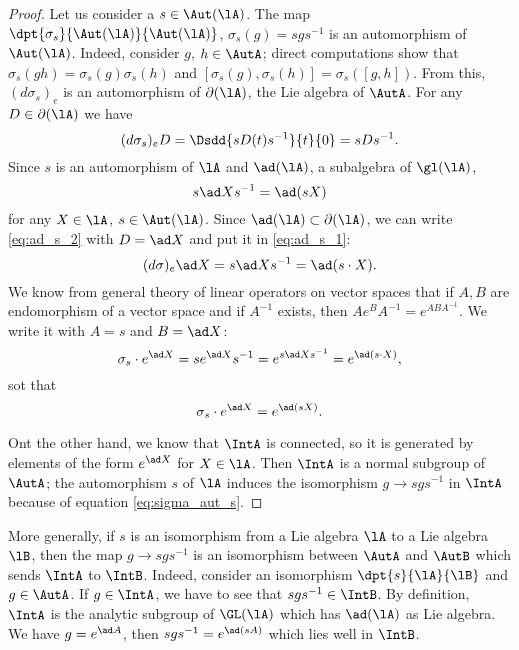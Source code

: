 \begin{proof}
Let us consider a $s\in\Aut(\lA)$. The map $\dpt{\sigma_s}{\Aut(\lA)}{\Aut(\lA)}$, $\sigma_s(g)=sgs^{-1}$ is an automorphism of $\Aut(\lA)$. Indeed, consider $g$, $h\in\AutA$; direct computations show that $\sigma_s(gh)=\sigma_s(g)\sigma_s(h)$ and $[\sigma_s(g),\sigma_s(h)]=\sigma_s([g,h])$. From this, $(d\sigma_s)_e$ is an automorphism of $\partial(\lA)$, the Lie algebra of $\AutA$. For any $D\in\partial(\lA)$ we have
\begin{equation}\label{eq:ad_s_2}
 (d\sigma_s)_eD=\Dsdd{ sD(t)s^{-1} }{t}{0}
             =sDs^{-1}.
\end{equation}
Since $s$ is an automorphism of $\lA$ and $\ad(\lA)$, a subalgebra of $\gl(\lA)$,
\begin{equation}\label{eq:ad_s_1}
  s\ad Xs^{-1}=\ad(sX)
\end{equation}
for any $X\in\lA$, $s\in\Aut(\lA)$. Since $\ad(\lA)\subset\partial(\lA)$, we can write \eqref{eq:ad_s_2} with $D=\ad X$ and put it in \eqref{eq:ad_s_1}:
\[
   (d\sigma)_e\ad X=s\ad Xs^{-1}=\ad(s\cdot X).
\]
We know from general theory of linear operators on vector spaces that if $A,B$ are endomorphism of a vector space and if $A^{-1}$ exists, then $Ae^BA^{-1}=e^{ABA^{-1}}$. We write it with $A=s$ and $B=\ad X$:
\[
  \sigma_s\cdot e^{\ad X}=se^{\ad X}s^{-1}=e^{s\ad Xs^{-1}}=e^{\ad(s\cdot X)},
\]
sot that
\begin{equation}\label{eq:sigma_aut_s}
  \sigma_s\cdot e^{\ad X}=e^{\ad(s X)}.
\end{equation}

Ont the other hand, we know that $\IntA$ is connected, so it is generated by elements of the form $e^{\ad X}$ for $X\in\lA$. Then $\IntA$ is a normal subgroup of $\AutA$; the automorphism $s$ of $\lA$ induces the isomorphism $g\to sgs^{-1}$ in $\IntA$ because of equation \eqref{eq:sigma_aut_s}.
\end{proof}

More generally, if $s$ is an isomorphism from a Lie algebra $\lA$ to a Lie algebra $\lB$, then the map $g\to sgs^{-1}$ is an isomorphism between $\AutA$ and $\AutB$ which sends $\IntA$ to $\IntB$. Indeed, consider an isomorphism $\dpt{s}{\lA}{\lB}$ and $g\in\AutA$. If $g\in\IntA$, we have to see that $sgs^{-1}\in\IntB$. By definition, $\IntA$ is the analytic subgroup of $\GL(\lA)$ which has $\ad(\lA)$ as Lie algebra. We have $g=e^{\ad A}$, then $sgs^{-1}=e^{\ad(sA)}$ which lies well in $\IntB$.

